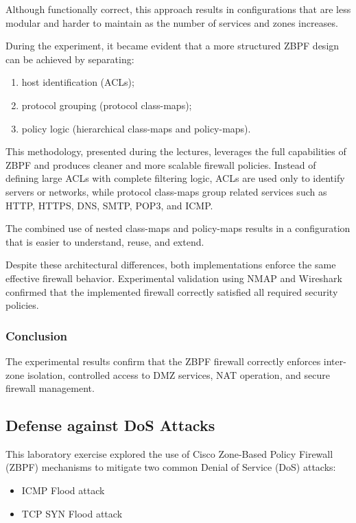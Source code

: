 \documentclass[12pt]{article}
\begin{document}
Although functionally correct, this approach results in configurations that are less modular and harder to maintain as the number of services and zones increases.

During the experiment, it became evident that a more structured ZBPF design can be achieved by separating:
\begin{enumerate}
    \item host identification (ACLs);
    \item protocol grouping (protocol class-maps);
    \item policy logic (hierarchical class-maps and policy-maps).
\end{enumerate}

This methodology, presented during the lectures, leverages the full capabilities of ZBPF and produces cleaner and more scalable firewall policies. Instead of defining large ACLs with complete filtering logic, ACLs are used only to identify servers or networks, while protocol class-maps group related services such as HTTP, HTTPS, DNS, SMTP, POP3, and ICMP.

The combined use of nested class-maps and policy-maps results in a configuration that is easier to understand, reuse, and extend.

Despite these architectural differences, both implementations enforce the same effective firewall behavior. Experimental validation using NMAP and Wireshark confirmed that the implemented firewall correctly satisfied all required security policies.
\subsubsection{Conclusion}

The experimental results confirm that the ZBPF firewall correctly enforces inter-zone isolation, controlled access to DMZ services, NAT operation, and secure firewall management.

\subsection{Defense against DoS Attacks}

This laboratory exercise explored the use of Cisco Zone-Based Policy Firewall (ZBPF) mechanisms
to mitigate two common Denial of Service (DoS) attacks:

\begin{itemize}
    \item ICMP Flood attack
    \item TCP SYN Flood attack
\end{itemize}
\end{document}
